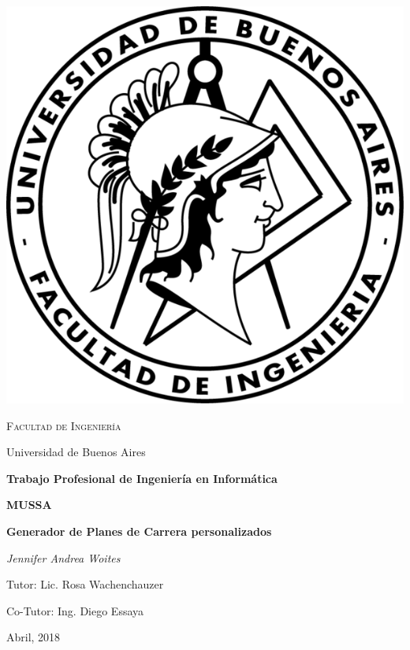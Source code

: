 \documentclass[a4paper]{article}
\begin{document}

\begin{titlepage}
	\centering
	\includegraphics{Imagenes/logo_fiuba.png}\par\vspace{1cm}
	{\scshape\LARGE Facultad de Ingeniería \par
	Universidad de Buenos Aires  \par}
	\vspace{1.5cm}
	{\Large\bfseries Trabajo Profesional de Ingeniería en Informática\par}
	\vspace{1.5cm}
	{\huge\bfseries MUSSA \par}
	\vspace{0.5cm}
	{\huge\bfseries Generador de Planes de Carrera personalizados\par}
	\vspace{1cm}
	{\Large\itshape Jennifer Andrea Woites\par}
	\vfill
	{\Large
	Tutor: Lic. Rosa Wachenchauzer \par
	\vspace{0.3cm}
	Co-Tutor: Ing. Diego Essaya}
	\vfill
	{\large Abril, 2018 \par}
\end{titlepage}
\end{document}
